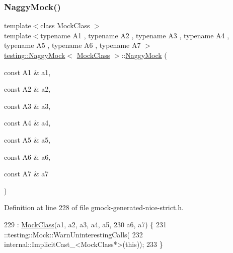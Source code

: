 \subsubsection{\texorpdfstring{Naggy\+Mock()}{NaggyMock()}\hspace{0.1cm}{\footnotesize\ttfamily [8/11]}}
{\footnotesize\ttfamily template$<$class Mock\+Class $>$ \\
template$<$typename A1 , typename A2 , typename A3 , typename A4 , typename A5 , typename A6 , typename A7 $>$ \\
\hyperlink{classtesting_1_1NaggyMock}{testing\+::\+Naggy\+Mock}$<$ \hyperlink{classMockClass}{Mock\+Class} $>$\+::\hyperlink{classtesting_1_1NaggyMock}{Naggy\+Mock} (\begin{DoxyParamCaption}\item[{const A1 \&}]{a1,  }\item[{const A2 \&}]{a2,  }\item[{const A3 \&}]{a3,  }\item[{const A4 \&}]{a4,  }\item[{const A5 \&}]{a5,  }\item[{const A6 \&}]{a6,  }\item[{const A7 \&}]{a7 }\end{DoxyParamCaption})\hspace{0.3cm}{\ttfamily [inline]}}



Definition at line 228 of file gmock-\/generated-\/nice-\/strict.\+h.


\begin{DoxyCode}
229                                                 : \hyperlink{classMockClass}{MockClass}(a1, a2, a3, a4, a5,
230       a6, a7) \{
231     ::testing::Mock::WarnUninterestingCalls(
232         internal::ImplicitCast\_<MockClass*>(\textcolor{keyword}{this}));
233   \}
\end{DoxyCode}
\mbox{\label{classtesting_1_1NaggyMock_a63b30506f56b792ffbdc5792a9630d5e}} 
